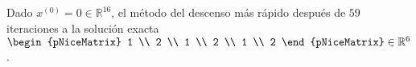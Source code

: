 \begin{frame}
	\tiny
	\begin{solution}
		Dado $x^{\left(0\right)}=0\in\mathbb{R}^{16}$, el
		\alert{método del descenso más rápido} después de $59$ iteraciones a la
		solución exacta
		\begin{math}
			\begin{pNiceMatrix}
				1 \\
				2 \\
				1 \\
				2 \\
				1 \\
				2
			\end{pNiceMatrix}\in
			\mathbb{R}^{6}
		\end{math}.
	\end{solution}
\end{frame}